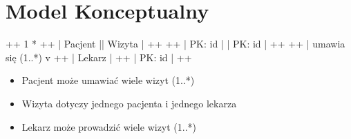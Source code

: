 \documentclass[a4paper,11pt,openany,english]{sphinxmanual}
\begin{document}
\section{Model Konceptualny}
\label{\detokenize{rozdzial3/index:model-konceptualny}}
\begin{sphinxVerbatim}[commandchars=\\\{\}]
  +\PYGZhy{}\PYGZhy{}\PYGZhy{}\PYGZhy{}\PYGZhy{}\PYGZhy{}\PYGZhy{}\PYGZhy{}\PYGZhy{}\PYGZhy{}\PYGZhy{}+      1       *      +\PYGZhy{}\PYGZhy{}\PYGZhy{}\PYGZhy{}\PYGZhy{}\PYGZhy{}\PYGZhy{}\PYGZhy{}\PYGZhy{}\PYGZhy{}\PYGZhy{}+
  |  Pacjent  |\PYGZhy{}\PYGZhy{}\PYGZhy{}\PYGZhy{}\PYGZhy{}\PYGZhy{}\PYGZhy{}\PYGZhy{}\PYGZhy{}\PYGZhy{}\PYGZhy{}\PYGZhy{}\PYGZhy{}\PYGZhy{}\PYGZhy{}\PYGZhy{}\PYGZhy{}\PYGZhy{}\PYGZhy{}\PYGZhy{}\PYGZhy{}|   Wizyta  |
  +\PYGZhy{}\PYGZhy{}\PYGZhy{}\PYGZhy{}\PYGZhy{}\PYGZhy{}\PYGZhy{}\PYGZhy{}\PYGZhy{}\PYGZhy{}\PYGZhy{}+                     +\PYGZhy{}\PYGZhy{}\PYGZhy{}\PYGZhy{}\PYGZhy{}\PYGZhy{}\PYGZhy{}\PYGZhy{}\PYGZhy{}\PYGZhy{}\PYGZhy{}+
  | PK: id    |                     | PK: id    |
  +\PYGZhy{}\PYGZhy{}\PYGZhy{}\PYGZhy{}\PYGZhy{}\PYGZhy{}\PYGZhy{}\PYGZhy{}\PYGZhy{}\PYGZhy{}\PYGZhy{}+                     +\PYGZhy{}\PYGZhy{}\PYGZhy{}\PYGZhy{}\PYGZhy{}\PYGZhy{}\PYGZhy{}\PYGZhy{}\PYGZhy{}\PYGZhy{}\PYGZhy{}+
       \PYGZca{}  \PYGZbs{}
       |   \PYGZbs{}
umawia się   \PYGZbs{}
  (1..*)      v
  +\PYGZhy{}\PYGZhy{}\PYGZhy{}\PYGZhy{}\PYGZhy{}\PYGZhy{}\PYGZhy{}\PYGZhy{}\PYGZhy{}\PYGZhy{}\PYGZhy{}+
  |  Lekarz   |
  +\PYGZhy{}\PYGZhy{}\PYGZhy{}\PYGZhy{}\PYGZhy{}\PYGZhy{}\PYGZhy{}\PYGZhy{}\PYGZhy{}\PYGZhy{}\PYGZhy{}+
  | PK: id    |
  +\PYGZhy{}\PYGZhy{}\PYGZhy{}\PYGZhy{}\PYGZhy{}\PYGZhy{}\PYGZhy{}\PYGZhy{}\PYGZhy{}\PYGZhy{}\PYGZhy{}+
\end{sphinxVerbatim}
\begin{description}
\begin{itemize}
\item {} 
\sphinxAtStartPar
Pacjent \textendash{} może umawiać wiele wizyt (1..*)

\item {} 
\sphinxAtStartPar
Wizyta \textendash{} dotyczy jednego pacjenta i jednego lekarza

\item {} 
\sphinxAtStartPar
Lekarz \textendash{} może prowadzić wiele wizyt (1..*)

\end{itemize}

\end{description}
\end{document}
